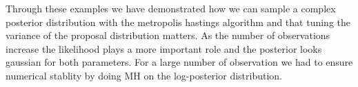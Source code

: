 Through these examples we have demonstrated how we can sample a complex posterior distribution with the metropolis hastings algorithm and that tuning the variance of the proposal distribution matters. As the number of observations increase the likelihood plays a more important role and the posterior looks gaussian for both parameters. For a large number of observation we had to ensure numerical stablity by doing MH on the log-posterior distribution.